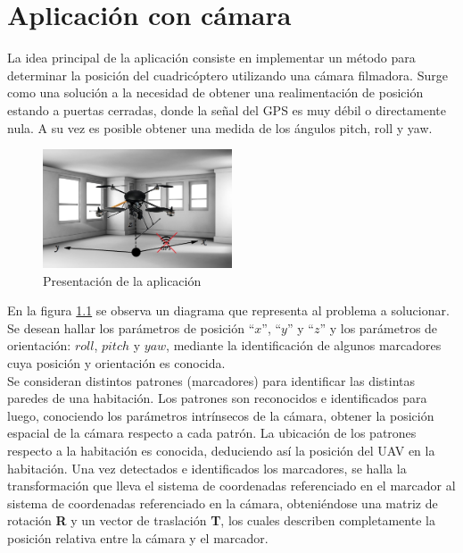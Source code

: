 %

\chapter{Aplicación con cámara}
\label{chap:camara}

La idea principal de la aplicación consiste en implementar un método para determinar la posición del cuadricóptero utilizando una cámara filmadora. Surge como una solución a la necesidad de obtener una realimentación de posición estando a puertas cerradas, donde la señal del GPS es muy débil o directamente nula. A su vez es posible obtener una medida de los ángulos pitch, roll y yaw.\\

\begin{figure}
	\begin{center}
		\includegraphics[width=0.5\textwidth]{./pics_camara/presentacion.jpg}
	\end{center}
	\caption{Presentación de la aplicación}
	\label{fig:presentacion}
\end{figure}

En la figura \ref{fig:presentacion} se observa un diagrama que representa al problema a solucionar. Se desean hallar los parámetros de posición ``$x$'', ``$y$'' y ``$z$'' y los parámetros de orientación: $roll$, $pitch$ y $yaw$, mediante la identificación de algunos marcadores cuya posición y orientación es conocida.\\

Se consideran distintos patrones (marcadores) para identificar las distintas paredes de una habitación. Los patrones son reconocidos e identificados para luego, conociendo los parámetros intrínsecos de la cámara, obtener la posición espacial de la cámara respecto a cada patrón. La ubicación de los patrones respecto a la habitación es conocida, deduciendo así la posición del UAV en la habitación. Una vez detectados e identificados los marcadores, se halla la transformación que lleva el sistema de coordenadas referenciado en el marcador al sistema de coordenadas referenciado en la cámara, obteniéndose una matriz de rotación \textbf{R} y un vector de traslación \textbf{T}, los cuales describen completamente la posición relativa entre la cámara y el marcador.\\


